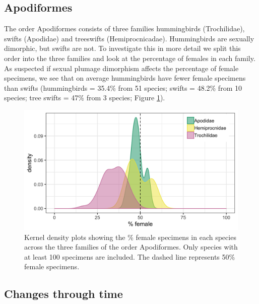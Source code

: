 \documentclass[a4paper, 12pt]{article}
\begin{document}
\newpage


\subsection*{Apodiformes}

The order Apodiformes consists of three families hummingbirds (Trochilidae), swifts (Apodidae) and treeswifts (Hemiprocnicadae).
Hummingbirds are sexually dimorphic, but swifts are not. 
To investigate this in more detail we split this order into the three families and look at the percentage of females in each family. 
As suspected if sexual plumage dimorphism affects the percentage of female specimens, we see that on average hummingbirds have fewer female specimens than swifts (hummingbirds = 35.4\% from 51 species; swifts = 48.2\% from 10 species; tree swifts = 47\% from 3 species; Figure \ref{fig-apod}).

\begin{figure}[H]
 \centering
  \includegraphics[width = \linewidth]{figures/apodiforme-families.png}
  \caption{Kernel density plots showing the \% female specimens in each species across the three families of the order Apodiformes. 
  Only species with at least 100 specimens are included. 
  The dashed line represents 50\% female specimens. 
}
  \label{fig-apod}
\end{figure}

\subsection*{Changes through time}
\end{document}
